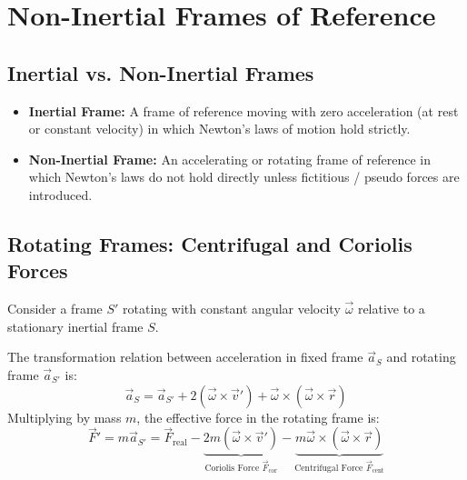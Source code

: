 \documentclass[12pt,a4paper]{article}
\begin{document}
\section{Non-Inertial Frames of Reference}

\subsection{Inertial vs. Non-Inertial Frames}

\begin{tcolorbox}[defbox, title={\textbf{Definition: Frames of Reference}}]
\begin{itemize}[leftmargin=*, itemsep=2pt]
  \item \textbf{Inertial Frame:} A frame of reference moving with zero acceleration (at rest or constant velocity) in which Newton's laws of motion hold strictly.
  \item \textbf{Non-Inertial Frame:} An accelerating or rotating frame of reference in which Newton's laws do not hold directly unless fictitious / pseudo forces are introduced.
\end{itemize}
\end{tcolorbox}

\subsection{Rotating Frames: Centrifugal and Coriolis Forces}

Consider a frame $S'$ rotating with constant angular velocity $\vec{\omega}$ relative to a stationary inertial frame $S$.

\begin{tcolorbox}[formulabox, title={\textbf{Transformation Equation for Acceleration}}]
The transformation relation between acceleration in fixed frame $\vec{a}_S$ and rotating frame $\vec{a}_{S'}$ is:
\begin{equation}
\vec{a}_S = \vec{a}_{S'} + 2(\vec{\omega} \times \vec{v}') + \vec{\omega} \times (\vec{\omega} \times \vec{r})
\end{equation}
Multiplying by mass $m$, the effective force in the rotating frame is:
\begin{equation}
\vec{F}' = m \vec{a}_{S'} = \vec{F}_{\text{real}} - \underbrace{2m(\vec{\omega} \times \vec{v}')}_{\text{Coriolis Force } \vec{F}_{\text{cor}}} - \underbrace{m\vec{\omega} \times (\vec{\omega} \times \vec{r})}_{\text{Centrifugal Force } \vec{F}_{\text{cent}}}
\end{equation}
\end{tcolorbox}
\end{document}
